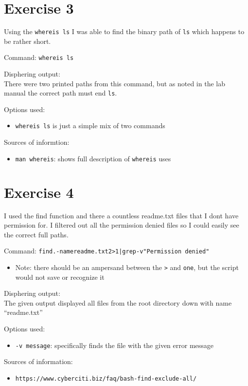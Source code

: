 \documentclass{article}
\begin{document}
\newpage
\section{Exercise 3}
Using the \texttt{whereis ls} I was able to find the binary path of \texttt{ls} which happens to be rather short. 

Command: \texttt{whereis ls}

Disphering output:\\
There were two printed paths from this command, but as noted in the lab manual the correct path must end \texttt{ls}. 

Options used:
\begin{itemize}
    \item{\texttt{whereis ls} is just a simple mix of two commands}
\end{itemize}

Sources of informtion:
\begin{itemize}
    \item{\texttt{man whereis}: shows full description of \texttt{whereis} uses}
\end{itemize}

\newpage
\section{Exercise 4}
I used the find function and there a countless readme.txt files that I dont have permission for. I filtered out all the permission denied files so I could easily see the correct full paths.

Command: \texttt{find.-namereadme.txt2>1|grep-v"Permission denied"}
\begin{itemize}
    \item{Note: there should be an ampersand between the \texttt{>} and \texttt{one}, but the script would not save or recognize it}
\end{itemize}

Disphering output:\\
The given output displayed all files from the root directory down with name ``readme.txt''

Options used:
\begin{itemize}
    \item{\texttt{-v message}: specifically finds the file with the given error message }
\end{itemize}

Sources of information:
\begin{itemize}
    \item{\texttt{https://www.cyberciti.biz/faq/bash-find-exclude-all/}}
\end{itemize}
\end{document}
